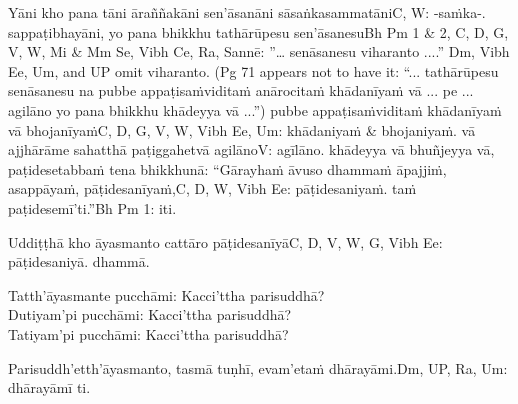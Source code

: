 Yāni kho pana tāni āraññakāni sen'āsanāni sāsaṅkasammatāni\makeatletter\hyperlink{endnote-appendix}\makeatother  C, W: -saṁka-. sappaṭibhayāni, yo pana bhikkhu tathārūpesu sen'āsanesu\makeatletter\hyperlink{endnote-appendix}\makeatother Bh Pm 1 & 2, C, D, G, V, W, Mi & Mm Se, Vibh Ce, Ra, Sannē: ”… senāsanesu viharanto ....” Dm, Vibh Ee, Um, and UP omit
viharanto. (Pg 71 appears not to have it: “... tathārūpesu senāsanesu na pubbe appaṭisaṁviditaṁ anārocitaṁ khādanīyaṁ vā ... pe ...
agilāno yo pana bhikkhu khādeyya vā ...”) pubbe appaṭisaṁviditaṁ khādanīyaṁ vā bhojanīyaṁ\makeatletter\hyperlink{endnote-appendix}\makeatother C, D, G, V, W, Vibh Ee, Um: khādaniyaṁ & bhojaniyaṁ. vā ajjhārāme sahatthā paṭiggahetvā agilāno\makeatletter\hyperlink{endnote-appendix}\makeatother V: agīlāno. khādeyya vā bhuñjeyya vā, paṭidesetabbaṁ tena bhikkhunā: ``Gārayhaṁ āvuso dhammaṁ āpajjiṁ, asappāyaṁ, pāṭidesanīyaṁ,\makeatletter\hyperlink{endnote-appendix}\makeatother C, D, W, Vibh Ee: pāṭidesaniyaṁ. taṁ paṭidesemī'ti.''\makeatletter\hyperlink{endnote-appendix}\makeatother Bh Pm 1: iti.



\medskip

\begin{center}
	Uddiṭṭhā kho āyasmanto cattāro pāṭidesanīyā\makeatletter\hyperlink{endnote-appendix}\makeatother C, D, V, W, G, Vibh Ee: pāṭidesaniyā. dhammā.

	\smallskip

	Tatth'āyasmante pucchāmi: Kacci'ttha parisuddhā?\\
	Dutiyam'pi pucchāmi: Kacci'ttha parisuddhā?\\
	Tatiyam'pi pucchāmi: Kacci'ttha parisuddhā?

	\smallskip

	Parisuddh'etth'āyasmanto, tasmā tuṇhī, evam'etaṁ dhārayāmi.\makeatletter\hyperlink{endnote-appendix}\makeatother Dm, UP, Ra, Um: dhārayāmī ti.
\end{center}

